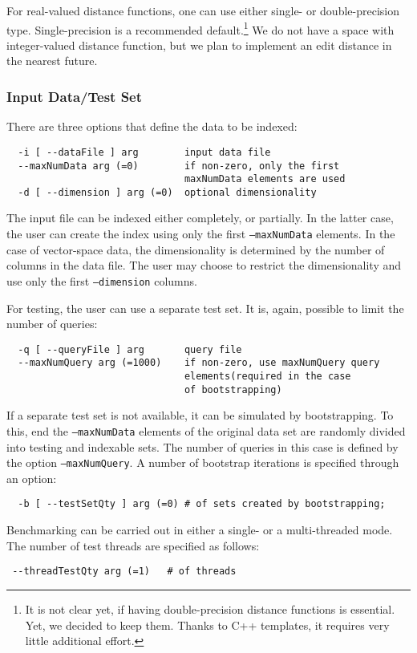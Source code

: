 \documentclass[runningheads,a4paper]{llncs}
\newcommand{\ttt}[1]{\texttt{#1}}
\begin{document}
For real-valued distance functions, one can use either single- or double-precision
type. Single-precision is a recommended default.\footnote{It is not clear yet,
if having double-precision distance functions is essential. Yet, we decided
to keep them. Thanks to C++ templates, it requires very little additional effort.}
We do not have a space with integer-valued distance function, but we
plan to implement an edit distance in the nearest future.

\subsubsection{Input Data/Test Set}
There are three options that define the data to be indexed:
\begin{verbatim}
  -i [ --dataFile ] arg        input data file
  --maxNumData arg (=0)        if non-zero, only the first 
                               maxNumData elements are used
  -d [ --dimension ] arg (=0)  optional dimensionality
\end{verbatim}
The input file can be indexed either completely, or partially.
In the latter case, the user can create the index using only
the first \ttt{--maxNumData} elements.
In the case of vector-space data, the dimensionality is determined
by the number of columns in the data file.
The user may choose to restrict the dimensionality and use only the first 
\ttt{--dimension} columns.

For testing, the user can use a separate test set.
It is, again, possible to limit the number of queries:
\begin{verbatim}
  -q [ --queryFile ] arg       query file
  --maxNumQuery arg (=1000)    if non-zero, use maxNumQuery query 
                               elements(required in the case 
                               of bootstrapping)
\end{verbatim}
If a separate test set is not available, it can be simulated by bootstrapping.
To this, end the \ttt{--maxNumData} elements of the original data set
are randomly divided into testing and indexable sets.
The number of queries in this case is defined by the option \ttt{--maxNumQuery}.
A number of bootstrap iterations is specified through an option:
\begin{verbatim}
  -b [ --testSetQty ] arg (=0) # of sets created by bootstrapping; 
\end{verbatim}
Benchmarking can be carried out in either a single- or a multi-threaded
mode. The number of test threads are specified as follows:
\begin{verbatim}
 --threadTestQty arg (=1)   # of threads
\end{verbatim}
\end{document}
